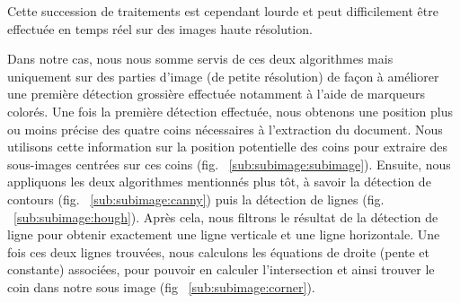 Cette succession de traitements est cependant lourde et peut difficilement être effectuée en temps réel sur des images haute résolution. 

Dans notre cas, nous nous somme servis de ces deux algorithmes mais uniquement sur des parties d'image (de petite résolution) de façon à améliorer une première détection grossière effectuée notamment à l'aide de marqueurs colorés. Une fois la première détection effectuée, nous obtenons une position plus ou moins précise des quatre coins nécessaires à l'extraction du document. Nous utilisons cette information sur la position potentielle des coins pour extraire des sous-images centrées sur ces coins (fig. ~\ref{sub:subimage:subimage}). Ensuite, nous appliquons les deux algorithmes mentionnés plus tôt, à savoir la détection de contours (fig. ~\ref{sub:subimage:canny}) puis la détection de lignes (fig. ~\ref{sub:subimage:hough}). Après cela, nous filtrons le résultat de la détection de ligne pour obtenir exactement une ligne verticale et une ligne horizontale. Une fois ces deux lignes trouvées, nous calculons les équations de droite (pente et constante) associées, pour pouvoir en calculer l'intersection et ainsi trouver le coin dans notre sous image (fig ~\ref{sub:subimage:corner}).

